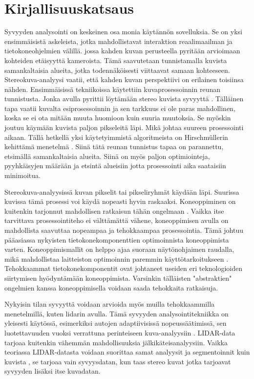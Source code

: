 \chapter{Kirjallisuuskatsaus}%
\label{ch:kirjallisuuskatsaus}

Syvyyden analysointi on keskeinen osa monia käytännön sovelluksia.
Se on yksi ensimmäisistä askeleista, jotka mahdollistavat interaktion reaalimaailman ja tietokoneohjelmien välillä.
jossa kahden kuvan perusteella pyritään arvioimaan kohteiden etäisyyttä kameroista. 
Tämä saavutetaan tunnistamalla kuvista samankaltaisia alueita, jotka todennäköisesti viittaavat samaan kohteeseen.
Stereokuva-analyysi vaatii, että kahden kuvan perspektiivi on erilainen toisiinsa nähden.
Ensimmäisissä tekniikoissa käytettiin kuvaprosessoinnin reunan tunnistusta. Jonka avulla pyrittii löytämään stereo kuvista syvyyttä \cite{BakerHenryHarlyn1982DfEa}.
Tälläinen tapa vaatii kuvalta esiprosessoinnin ja sen tarkkuus ei ole paras mahdollinen, koska se ei ota mitään muuta huomioon kuin suuria muutoksia.
Se myöskin joutuu käymään kuvista paljon pikseleitä läpi. 
Mikä johtaa suureen prosessointi aikaan.
Tällä hetkellä yksi käytetyimmistä algoritmeista on Hirschmüllerin kehittämä menetelmä \cite{hirschmuller2005babel}.
Siinä tätä reunan tunnistus tapaa on parannettu, etsimällä samankaltaisia alueita. 
Siinä on myös paljon optimiointeja, pyyhkäisyjen määrään ja etsintä alueisiin jotta prosessointi aika saataisiin minimoitua.

Stereokuva-analyysissä kuvan pikselit tai pikseliryhmät käydään läpi.
Suurissa kuvissa tämä prosessi voi käydä nopeasti hyvin raskaaksi.
Koneoppiminen on kuitenkin tarjonnut mahdollisen ratkaisun tähän ongelmaan \cite{LagaHamid2022ASoD}.
Vaikka itse tarvittava prosessointiteho ei välttämättä vähene, koneoppimisen avulla on mahdollista saavuttaa nopeampaa ja tehokkaampaa prosessointia.
Tämä johtuu pääasiassa nykyisten tietokonekomponenttien optimoinnista koneoppimista varten.
Koneoppimismallit on helppo ajaa suoraan näytönohjaimen raudalla, mikä mahdollistaa laitteiston optimoinnin paremmin käyttötarkoitukseen \cite{LeeVictorW2010Dt1G}.
Tehokkaammat tietokonekomponentit ovat johtaneet useiden eri teknologioiden siirtymisen hyödyntämään koneoppimista.
Varsinkin tälläisten "abstraktien" ongelmien kanssa koneoppimisella voidaan saada tehokkaita ratkaisuja.


Nykyisin tilan syvyyttä voidaan arvioida myös muilla tehokkaammilla menetelmillä, kuten lidarin avulla.
Tämä syvyyden analysointitekniikka on yleisesti käytössä, esimerkiksi autojen adaptiivisissä nopeussäätimissä, sen luotettavuuden vuoksi verrattuna perinteiseen kuva-analyysiin \cite{RorizRicardo2022ALTA}.
LIDAR-data tarjoaa kuitenkin vähemmän mahdollisuuksia jälkikäteisanalyysiin.
Vaikka teoriassa LIDAR-datasta voidaan suorittaa samat analyysit ja segmentoinnit kuin kuvista \cite{SunJiaming2020DRS3}, se tarjoaa vain syvyysdatan, kun taas stereo kuvat jotka tarjoavat syvyyden lisäksi itse kuvadatan.

